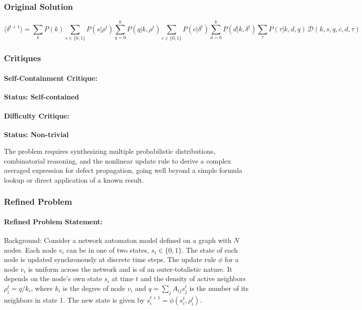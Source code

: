 \documentclass[10pt]{article}
\begin{document}
\subsubsection*{Original Solution}
\[ \langle\delta^{t+1}\rangle = \sum_k P(k) \sum_{s \in \{0,1\}} P(s|\rho^t) \sum_{q=0}^k P(q|k,\rho^t) \sum_{c \in \{0,1\}}P(c|\delta^t) \sum_{d=0}^k P(d|k, \delta^t) \sum_{\tau} P(\tau|k,d,q) \, \mathcal{D}(k, s, q, c, d, \tau) \]

\subsubsection*{Critiques}
\paragraph*{Self-Containment Critique:}
\textcolor{pass}{\textbf{Status: Self-contained}}




\paragraph*{Difficulty Critique:}
\textcolor{pass}{\textbf{Status: Non-trivial}}

The problem requires synthesizing multiple probabilistic distributions, combinatorial reasoning, and the nonlinear update rule to derive a complex averaged expression for defect propagation, going well beyond a simple formula lookup or direct application of a known result.


\subsubsection*{Refined Problem}
\paragraph*{Refined Problem Statement:}
Background:
Consider a network automaton model defined on a graph with $N$ nodes. Each node $v_i$ can be in one of two states, $s_i \in \{0,1\}$. The state of each node is updated synchronously at discrete time steps. The update rule $\phi$ for a node $v_i$ is uniform across the network and is of an outer-totalistic nature. It depends on the node's own state $s_i$ at time $t$ and the density of active neighbors $\rho_i^t = q/k_i$, where $k_i$ is the degree of node $v_i$ and $q = \sum_{j} A_{ij}s_j^t$ is the number of its neighbors in state 1. The new state is given by $s_i^{t+1} = \phi(s_i^t, \rho_i^t)$.
\end{document}

